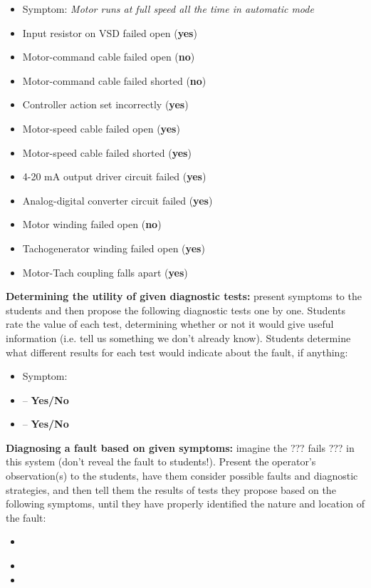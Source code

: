 \begin{itemize}
\item{} Symptom: {\it Motor runs at full speed all the time in automatic mode}
\item{} Input resistor on VSD failed open ({\bf yes})
\item{} Motor-command cable failed open ({\bf no})
\item{} Motor-command cable failed shorted ({\bf no})
\item{} Controller action set incorrectly ({\bf yes})
\item{} Motor-speed cable failed open ({\bf yes})
\item{} Motor-speed cable failed shorted ({\bf yes})
\item{} 4-20 mA output driver circuit failed ({\bf yes})
\item{} Analog-digital converter circuit failed ({\bf yes})
\item{} Motor winding failed open ({\bf no})
\item{} Tachogenerator winding failed open ({\bf yes})
\item{} Motor-Tach coupling falls apart ({\bf yes})
\end{itemize}


\vskip 10pt


\noindent
{\bf Determining the utility of given diagnostic tests:} present symptoms to the students and then propose the following diagnostic tests one by one.  Students rate the value of each test, determining whether or not it would give useful information (i.e. tell us something we don't already know).  Students determine what different results for each test would indicate about the fault, if anything:

\begin{itemize}
\item{} Symptom: {\it }
\item{}  -- {\bf Yes/No}
\item{}  -- {\bf Yes/No}
\end{itemize}


\vskip 10pt


\noindent
{\bf Diagnosing a fault based on given symptoms:} imagine the ??? fails ??? in this system (don't reveal the fault to students!).  Present the operator's observation(s) to the students, have them consider possible faults and diagnostic strategies, and then tell them the results of tests they propose based on the following symptoms, until they have properly identified the nature and location of the fault:

\begin{itemize}
\item{} {\it }
\item{} 
\item{} 
\end{itemize}



